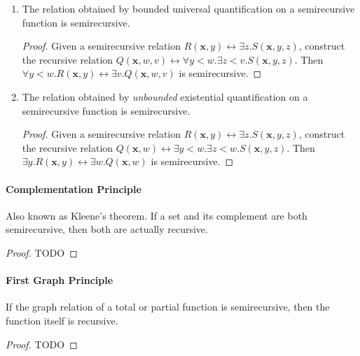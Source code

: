 \begin{enumerate}
    \item The relation obtained by bounded universal quantification on a
    semirecursive function is semirecursive.   

      \begin{proof}
        Given a semirecursive relation $R(\mathbf{x}, y) \leftrightarrow \exists
        z. S(\mathbf{x}, y, z)$, construct the recursive relation $Q(\mathbf{x},
        w, v) \leftrightarrow \forall y < w. \exists z < v. S(\mathbf{x}, y,
        z)$. Then $\forall y < w. R(\mathbf{x}, y) \leftrightarrow \exists v.
        Q(\mathbf{x}, w, v)$ is semirecursive.
      \end{proof}

    \item The relation obtained by \textit{unbounded} existential quantification
    on a semirecursive function is semirecursive.

      \begin{proof}
        Given a semirecursive relation $R(\mathbf{x}, y) \leftrightarrow \exists
        z. S(\mathbf{x}, y, z)$, construct the recursive relation $Q(\mathbf{x},
        w) \leftrightarrow \exists y < w. \exists z < w. S(\mathbf{x}, y, z)$.
        Then $\exists y. R(\mathbf{x}, y) \leftrightarrow \exists w.
        Q(\mathbf{x}, w)$ is semirecursive.
      \end{proof}

\end{enumerate}

\paragraph{Complementation Principle}
Also known as Kleene's theorem. If a set and its complement are both
semirecursive, then both are actually recursive.

\begin{proof}
TODO
\end{proof}

\paragraph{First Graph Principle}
If the graph relation of a total or partial function is semirecursive, then the
function itself is recursive.

\begin{proof}
TODO
\end{proof}
